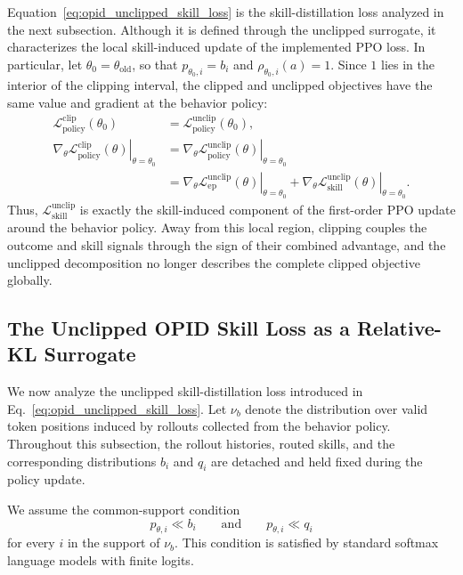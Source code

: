 Equation~\ref{eq:opid_unclipped_skill_loss} is the skill-distillation
loss analyzed in the next subsection. Although it is defined through the
unclipped surrogate, it characterizes the local skill-induced update of
the implemented PPO loss. In particular, let
\(\theta_0=\theta_{\mathrm{old}}\), so that
\(p_{\theta_0,i}=b_i\) and
\(\rho_{\theta_0,i}(a)=1\). Since \(1\) lies in the interior of the
clipping interval, the clipped and unclipped objectives have the same
value and gradient at the behavior policy:
\begin{equation*}
\begin{aligned}
 \mathcal L_{\mathrm{policy}}^{\mathrm{clip}}(\theta_0)
 &=
 \mathcal L_{\mathrm{policy}}^{\mathrm{unclip}}(\theta_0),
 \\
 \left.
 \nabla_\theta
 \mathcal L_{\mathrm{policy}}^{\mathrm{clip}}(\theta)
 \right|_{\theta=\theta_0}
 &=
 \left.
 \nabla_\theta
 \mathcal L_{\mathrm{policy}}^{\mathrm{unclip}}(\theta)
 \right|_{\theta=\theta_0}
 \\
 &=
 \left.
 \nabla_\theta
 \mathcal L_{\mathrm{ep}}^{\mathrm{unclip}}(\theta)
 \right|_{\theta=\theta_0}
 +
 \left.
 \nabla_\theta
 \mathcal L_{\mathrm{skill}}^{\mathrm{unclip}}(\theta)
 \right|_{\theta=\theta_0}.
\end{aligned}
\end{equation*}
Thus,
\(\mathcal L_{\mathrm{skill}}^{\mathrm{unclip}}\) is exactly the
skill-induced component of the first-order PPO update around the behavior
policy. Away from this local region, clipping couples the outcome and
skill signals through the sign of their combined advantage, and the
unclipped decomposition no longer describes the complete clipped
objective globally.

\subsection{The Unclipped OPID Skill Loss as a Relative-KL Surrogate}
\label{app:teacher_advantage}

We now analyze the unclipped skill-distillation loss introduced in
Eq.~\ref{eq:opid_unclipped_skill_loss}. Let \(\nu_b\) denote the
distribution over valid token positions induced by rollouts collected from
the behavior policy. Throughout this subsection, the rollout histories,
routed skills, and the corresponding distributions \(b_i\) and \(q_i\) are
detached and held fixed during the policy update.

We assume the common-support condition
\begin{equation*}
 p_{\theta,i}\ll b_i
 \qquad\text{and}\qquad
 p_{\theta,i}\ll q_i
\end{equation*}
for every \(i\) in the support of \(\nu_b\). This condition is satisfied by
standard softmax language models with finite logits.

